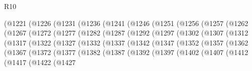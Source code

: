 \begin{lexlean}{R10}
\begin{coremodule}
            (@1221
              (@1226
                (@1231
                  (@1236
                    (@1241
                      (@1246
                        (@1251
                          (@1256
                            (@1257
                              (@1262
                                (@1267
                                  (@1272
                                    (@1277
                                      (@1282
                                        (@1287
                                          (@1292
                                            (@1297
                                              (@1302
                                                (@1307
                                                  (@1312
                                                    (@1317
                                                      (@1322
                                                        (@1327
                                                          (@1332
                                                            (@1337
                                                              (@1342
                                                                (@1347
                                                                  (@1352
                                                                    (@1357
                                                                      (@1362
                                                                        (@1367
                                                                          (@1372
                                                                            (@1377
                                                                              (@1382
                                                                                (@1387
                                                                                  (@1392
                                                                                    (@1397
                                                                                      (@1402
                                                                                        (@1407
                                                                                          (@1412
                                                                                            (@1417
                                                                                              (@1422
                                                                                                (@1427

\end{coremodule}
\end{lexlean}
